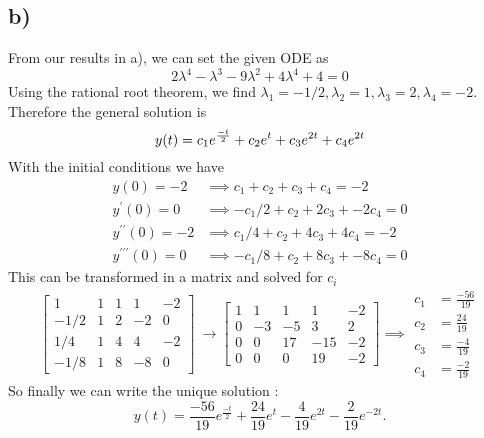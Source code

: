 \documentclass[
	12pt,
	]{article}
\newcommand{\p}{\prime}
\theoremstyle{definition}
\theoremstyle{definition}
\theoremstyle{definition}
\theoremstyle{definition}
\theoremstyle{definition}
\theoremstyle{example}
\theoremstyle{note}
\theoremstyle{remark}
\theoremstyle{example}
\begin{document}
		\subsection*{b) }
			From our results in a), we can set the given ODE as 
			$$ 2\lambda^{4} - \lambda^{3} - 9\lambda^{2} + 4\lambda^{4} +4 =0$$
			Using the rational root theorem, we find $\lambda_{1} = -1/2 , \lambda_{2} = 1, \lambda_{3} = 2 , \lambda_{4} = -2$. Therefore the general solution is 
			$$ y(t) = c_{1}e^{\frac{-t}{2}} + c_{2} e^{t} + c_{3} e^{2t} + c_{4}e^{\-2t}$$
			With the initial conditions we have 
			\begin{align*}
				y(0) = -2 &\implies c_{1} + c_{2} + c_{3} + c_{4} =-2 \\
				y^{\p}(0) = 0 &\implies -c_{1}/2 + c_{2} + 2c_{3} + -2c_{4} =0 \\
				y^{\p\p}(0) = -2 &\implies c_{1}/4 + c_{2} + 4c_{3} + 4c_{4} =-2 \\
				y^{\p\p\p}(0) = 0 &\implies -c_{1}/8 + c_{2} + 8c_{3} + -8c_{4} =0 
			\end{align*}
			This can be transformed in a matrix and solved for $c_{i}$
			\begin{equation*}
				\begin{bmatrix}
					1 & 1& 1& 1 & -2 \\
					-1/2 & 1 & 2 & -2 & 0 \\
					1/4 & 1 & 4 & 4 & -2 \\
					-1/8 & 1 & 8 & -8 &0 
				\end{bmatrix}
				 \ \xrightarrow{} 
				\begin{bmatrix}
					1 & 1& 1& 1 & -2 \\
					0 & -3 & -5 & 3 & 2 \\
					0 & 0 & 17 & -15 & -2 \\
					0 & 0 & 0 & 19 & -2 
				\end{bmatrix}
				\implies 
				\begin{align*}
					c_{1} &= \frac{-56}{19} \\
					c_{2} &= \frac{24}{19} \\
					c_{3} &= \frac{-4}{19} \\
					c_{4} &= \frac{-2}{19} 
				\end{align*}
			\end{equation*}
			So finally we can write the unique solution : 
			$$ y(t) = \frac{-56}{19}e^{\frac{-t}{2}} + \frac{24}{19} e^{t} - \frac{4}{19}e^{2t}  - \frac{2}{19}e^{-2t}.$$
\end{document}
